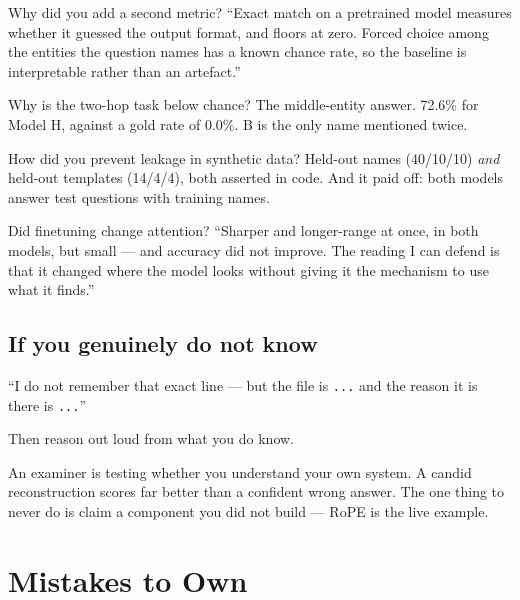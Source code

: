 \documentclass[11pt]{report}
\newcommand{\p}[1]{\texttt{#1}}
\begin{document}
\begin{qabox}{Why did you add a second metric?}
``Exact match on a pretrained model measures whether it guessed the output
format, and floors at zero. Forced choice among the entities the question names
has a known chance rate, so the baseline is interpretable rather than an
artefact.''
\end{qabox}

\begin{qabox}{Why is the two-hop task below chance?}
The middle-entity answer. 72.6\% for Model H, against a gold rate of 0.0\%.
B is the only name mentioned twice.
\end{qabox}

\begin{qabox}{How did you prevent leakage in synthetic data?}
Held-out names (40/10/10) \emph{and} held-out templates (14/4/4), both asserted
in code. And it paid off: both models answer test questions with training names.
\end{qabox}

\begin{qabox}{Did finetuning change attention?}
``Sharper and longer-range at once, in both models, but small --- and accuracy
did not improve. The reading I can defend is that it changed where the model
looks without giving it the mechanism to use what it finds.''
\end{qabox}

\section{If you genuinely do not know}

\begin{saybox}
``I do not remember that exact line --- but the file is \p{...} and the reason it
is there is \p{...}''

Then reason out loud from what you do know.
\end{saybox}

An examiner is testing whether you understand your own system. A candid
reconstruction scores far better than a confident wrong answer. The one thing to
never do is claim a component you did not build --- RoPE is the live example.

\chapter{Mistakes to Own}
\label{ch:mistakes}
\end{document}
